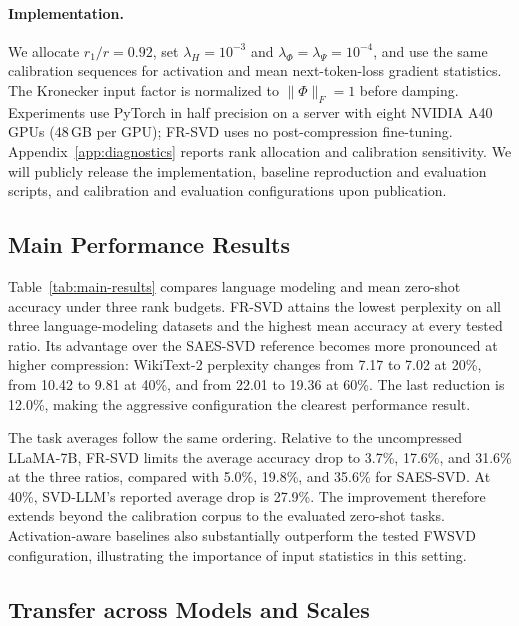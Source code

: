 \documentclass[11pt]{article}
\begin{document}
\paragraph{Implementation.}
We allocate $r_1/r=0.92$, set $\lambda_H=10^{-3}$ and $\lambda_\Phi=\lambda_\Psi=10^{-4}$, and use the same calibration sequences for activation and mean next-token-loss gradient statistics. The Kronecker input factor is normalized to $\|\Phi\|_F=1$ before damping. Experiments use PyTorch in half precision on a server with eight NVIDIA A40 GPUs (48\,GB per GPU); FR-SVD uses no post-compression fine-tuning. Appendix~\ref{app:diagnostics} reports rank allocation and calibration sensitivity. We will publicly release the implementation, baseline reproduction and evaluation scripts, and calibration and evaluation configurations upon publication.



\subsection{Main Performance Results}\label{sec:main-results-llama7b}

Table~\ref{tab:main-results} compares language modeling and mean zero-shot accuracy under three rank budgets. FR-SVD attains the lowest perplexity on all three language-modeling datasets and the highest mean accuracy at every tested ratio. Its advantage over the SAES-SVD reference becomes more pronounced at higher compression: WikiText-2 perplexity changes from 7.17 to 7.02 at 20\%, from 10.42 to 9.81 at 40\%, and from 22.01 to 19.36 at 60\%. The last reduction is 12.0\%, making the aggressive configuration the clearest performance result.

The task averages follow the same ordering. Relative to the uncompressed LLaMA-7B, FR-SVD limits the average accuracy drop to 3.7\%, 17.6\%, and 31.6\% at the three ratios, compared with 5.0\%, 19.8\%, and 35.6\% for SAES-SVD. At 40\%, SVD-LLM's reported average drop is 27.9\%. The improvement therefore extends beyond the calibration corpus to the evaluated zero-shot tasks. Activation-aware baselines also substantially outperform the tested FWSVD configuration, illustrating the importance of input statistics in this setting.

\subsection{Transfer across Models and Scales}
\end{document}
